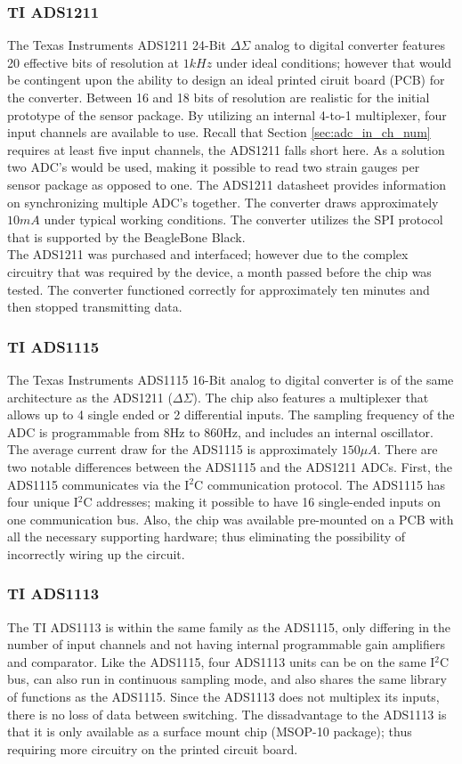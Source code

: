 \subsubsection{TI ADS1211}
\label{sec:ADC_ADS1211}
\indent The Texas Instruments ADS1211 24-Bit $\Delta \Sigma$ analog to digital converter features 20 effective bits of resolution at $1kHz$ under ideal
conditions; however that would be contingent upon the ability to design an ideal printed ciruit board (PCB) for the converter. Between 16 and 18 bits of
resolution are realistic for the initial prototype of the sensor package. By utilizing an internal 4-to-1 multiplexer, four input channels are available
to use. Recall that Section \ref{sec:adc_in_ch_num} requires at least five input channels, the ADS1211 falls short here. As a solution two ADC's would
be used, making it possible to read two strain gauges per sensor package as opposed to one. The ADS1211 datasheet provides information on synchronizing
multiple ADC's together. The converter draws approximately $10mA$ under typical working conditions. The converter utilizes the SPI protocol that is
supported by the BeagleBone Black.\\
\indent The ADS1211 was purchased and interfaced; however due to the complex circuitry that was required by the device, a month passed before the chip was
tested. The converter functioned correctly for approximately ten minutes and then stopped transmitting data. 
\subsubsection{TI ADS1115}
\label{sec:ADC_ADS1115}
\indent The Texas Instruments ADS1115 16-Bit analog to digital converter is of the same architecture as the ADS1211 ($\Delta \Sigma$). The chip also
features a multiplexer that allows up to 4 single ended or 2 differential inputs. The sampling frequency of the ADC is programmable from 8Hz to 860Hz, and
includes an internal oscillator. The average current draw for the ADS1115 is approximately $150\mu A$. There are two notable differences between the
ADS1115 and the ADS1211 ADCs. First, the ADS1115 communicates via the I$^{2}$C communication protocol. The ADS1115 has four unique I$^{2}$C addresses;
making it possible to have 16 single-ended inputs on one communication bus. Also, the chip was available pre-mounted on a PCB with all the necessary
supporting hardware; thus eliminating the possibility of incorrectly wiring up the circuit. 
\subsubsection{TI ADS1113}
\label{sec:ADC_ADS1113}
\indent The TI ADS1113 is within the same family as the ADS1115, only differing in the number of input channels and not having internal programmable gain amplifiers and comparator.
Like the ADS1115, four ADS1113 units can be on the same I$^{2}$C bus, can also run in continuous sampling mode, and also shares the same library of functions as the ADS1115.
Since the ADS1113 does not multiplex its inputs, there is no loss of data between switching.
The dissadvantage to the ADS1113 is that it is only available as a surface mount chip (MSOP-10 package); thus requiring more circuitry on the printed circuit board.


